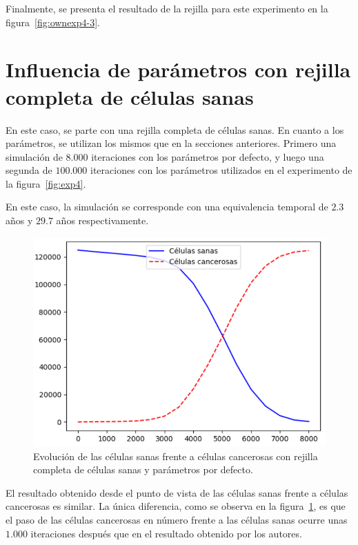 Finalmente, se presenta el resultado de la rejilla para este experimento en la figura~\ref{fig:ownexp4-3}.

\clearpage

\section{Influencia de parámetros con rejilla completa de células sanas}

En este caso, se parte con una rejilla completa de células sanas. En cuanto a los parámetros,
se utilizan los mismos que en la secciones anteriores. Primero una simulación de $8.000$ iteraciones
con los parámetros por defecto, y luego una segunda de $100.000$ iteraciones con los parámetros
utilizados en el experimento de la figura~\ref{fig:exp4}.

En este caso, la simulación se corresponde con una equivalencia temporal
de $2.3$ años y $29.7$ años respectivamente.

\begin{figure}[h]
\centering
\includegraphics[scale=0.8]{figures/experiments/exp5/healthvscarcino}
\caption{Evolución de las células sanas frente a células cancerosas con rejilla completa de células sanas y parámetros por defecto.}
\label{fig:ownexp5-1}
\end{figure}

El resultado obtenido desde el punto de vista de las células sanas frente a células cancerosas
es similar. La única diferencia, como se observa en la figura~\ref{fig:ownexp5-1}, es
que el paso de las células cancerosas en número frente a las células sanas ocurre unas
$1.000$ iteraciones después que en el resultado obtenido por los autores.

